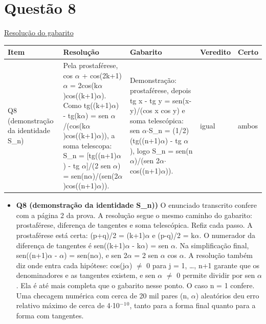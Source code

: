\documentclass{article}%
\begin{document}
\section*{Questão 8}%
\href{https://poliedroresolve.sistemapoliedro.com.br/vestibulares/ime/2027/ime-2-fase-dia-1-26-10-2026-2-fase-dia-1/dissertativa-8-matematica-2-fase-dia-1-ime-2027}{Resolução do gabarito}\par\smallskip%
\begin{longtable}{@{}p{} p{} p{} p{} p{}@{}}\toprule Item & Resolução & Gabarito & Veredito & Certo \\ \midrule
Q8 (demonstração da identidade S\_n) & Pela prostaférese, cos $\alpha$ + cos(2k+1)$\alpha$ = 2cos(k$\alpha$)cos((k+1)$\alpha$). Como tg((k+1)$\alpha$) - tg(k$\alpha$) = sen $\alpha$/(cos(k$\alpha$)cos((k+1)$\alpha$)), a soma telescopa: S\_n = {[}tg((n+1)$\alpha$) - tg $\alpha${]}/(2 sen $\alpha$) = sen(n$\alpha$)/(sen(2$\alpha$)cos((n+1)$\alpha$)). & Demonstração: prostaférese, depois tg x - tg y = sen(x-y)/(cos x cos y) e soma telescópica: sen $\alpha$$\cdot$S\_n = (1/2)(tg((n+1)$\alpha$) - tg $\alpha$), logo S\_n = sen(n$\alpha$)/(sen 2$\alpha$$\cdot$cos((n+1)$\alpha$)). & igual & ambos \\
\bottomrule\end{longtable}%
\begin{itemize}%
\item%
\textbf{Q8 (demonstração da identidade S\_n))} O enunciado transcrito confere com a página 2 da prova. A resolução segue o mesmo caminho do gabarito: prostaférese, diferença de tangentes e soma telescópica. Refiz cada passo. A prostaférese está certa: (p+q)/2 = (k+1)$\alpha$ e (p-q)/2 = k$\alpha$. O numerador da diferença de tangentes é sen((k+1)$\alpha$ - k$\alpha$) = sen $\alpha$. Na simplificação final, sen((n+1)$\alpha$ - $\alpha$) = sen(n$\alpha$), e sen 2$\alpha$ = 2 sen $\alpha$ cos $\alpha$. A resolução também diz onde entra cada hipótese: cos(j$\alpha$) $\neq$ 0 para j = 1, \ldots{}, n+1 garante que os denominadores e as tangentes existem, e sen $\alpha$ $\neq$ 0 permite dividir por sen $\alpha$. Ela é até mais completa que o gabarito nesse ponto. O caso n = 1 confere. Uma checagem numérica com cerca de 20 mil pares (n, $\alpha$) aleatórios deu erro relativo máximo de cerca de 4$\cdot$10$^{-}$$^{1}$$^{0}$, tanto para a forma final quanto para a forma com tangentes.%
\end{itemize}%
\end{document}
